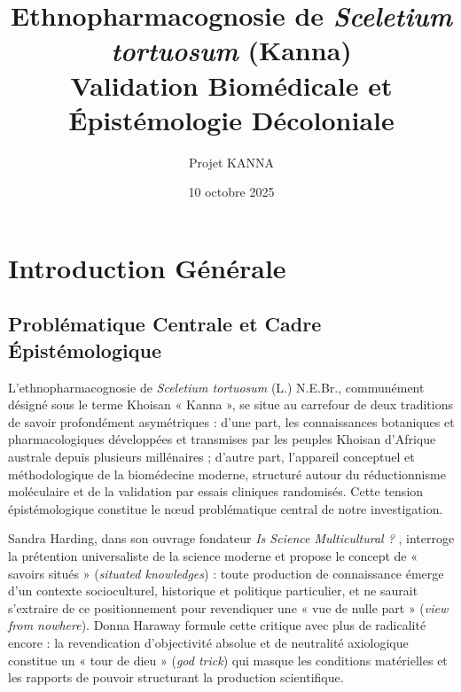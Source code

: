 \documentclass[12pt,a4paper]{report}
\begin{document}
\title{Ethnopharmacognosie de \textit{Sceletium tortuosum} (Kanna)\\
\large Validation Biomédicale et Épistémologie Décoloniale}
\author{Projet KANNA}
\date{10 octobre 2025}

\maketitle

\tableofcontents

\chapter*{Introduction Générale}

\section{Problématique Centrale et Cadre Épistémologique}

L'ethnopharmacognosie de \textit{Sceletium tortuosum} (L.) N.E.Br., communément désigné sous le terme Khoisan « Kanna », se situe au carrefour de deux traditions de savoir profondément asymétriques : d'une part, les connaissances botaniques et pharmacologiques développées et transmises par les peuples Khoisan d'Afrique australe depuis plusieurs millénaires ; d'autre part, l'appareil conceptuel et méthodologique de la biomédecine moderne, structuré autour du réductionnisme moléculaire et de la validation par essais cliniques randomisés. Cette tension épistémologique constitue le nœud problématique central de notre investigation.

Sandra Harding, dans son ouvrage fondateur \textit{Is Science Multicultural ?} \cite{Harding1998}, interroge la prétention universaliste de la science moderne et propose le concept de « savoirs situés » (\textit{situated knowledges}) : toute production de connaissance émerge d'un contexte socioculturel, historique et politique particulier, et ne saurait s'extraire de ce positionnement pour revendiquer une « vue de nulle part » (\textit{view from nowhere}). Donna Haraway \cite{Haraway1988} formule cette critique avec plus de radicalité encore : la revendication d'objectivité absolue et de neutralité axiologique constitue un « tour de dieu » (\textit{god trick}) qui masque les conditions matérielles et les rapports de pouvoir structurant la production scientifique.
\end{document}
